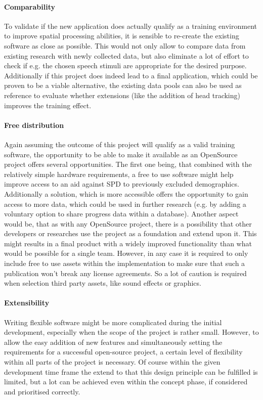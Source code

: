 \documentclass[a4paper,11pt]{article}%
\renewcommand{\\}{\vspace*{0.5\baselineskip} \newline}
\begin{document}
\paragraph{Comparability} To validate if the new application does actually qualify as a training environment to improve spatial processing abilities, it is sensible to re-create the existing software as close as possible. This would not only allow to compare data from existing research with newly collected data, but also eliminate a lot of effort to check if e.g. the chosen speech stimuli are appropriate for the desired purpose. Additionally if this project does indeed lead to a final application, which could be proven to be a viable alternative, the existing data pools can also be used as reference to evaluate whether extensions (like the addition of head tracking) improves the training effect.


\paragraph{Free distribution} Again assuming the outcome of this project will qualify as a valid training software, the opportunity to be able to make it available as an OpenSource project offers several opportunities. The first one being, that combined with the relatively simple hardware requirements, a free to use software might help improve access to an aid against \ac{SPD} to previously excluded demographics. Additionally a solution, which is more accessible offers the opportunity to gain access to more data, which could be used in further research (e.g. by adding a voluntary option to share progress data within a database). Another aspect would be, that as with any OpenSource project, there is a possibility that other developers or researches use the project as a foundation and extend upon it. This might results in a final product with a widely improved functionality than what would be possible for a single team. However, in any case it is required to only include free to use assets within the implementation to make sure that such a publication won't break any license agreements. So a lot of caution is required when selection third party assets, like sound effects or graphics.


\paragraph{Extensibility} Writing flexible software might be more complicated during the initial development, especially when the scope of the project is rather small. However, to allow the easy addition of new features and simultaneously setting the requirements for a successful open-source project, a certain level of flexibility within all parts of the project is necessary. Of course within the given development time frame the extend to that this design principle can be fulfilled is limited, but a lot can be achieved even within the concept phase, if considered and prioritised correctly.
\end{document}
